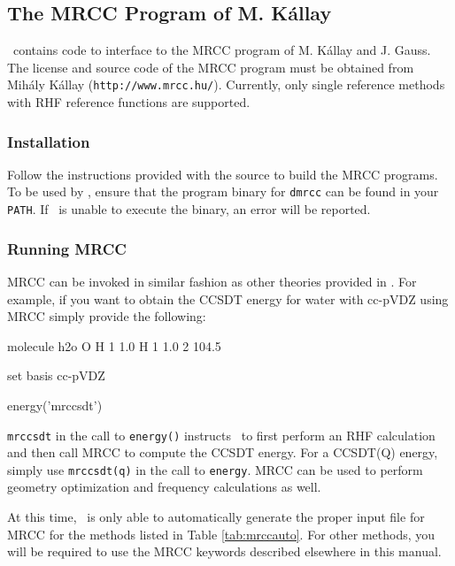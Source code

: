 \subsection{The MRCC Program of M. K\'{a}llay} \label{mrcc}
\PSIfour\ contains code to interface to the MRCC program of M. K\'{a}llay
and J. Gauss.  The license and source code of the MRCC program must be
obtained from Mih\'{a}ly K\'{a}llay ({\tt http://www.mrcc.hu/}). Currently, only single reference methods with RHF reference functions are supported.
\renewcommand{\optionname}[2]{\texttt{\nameref{op-#2-#1}}}

\subsubsection{Installation}
Follow the instructions provided with the source to build the MRCC programs. To be used by \PSIfour, ensure that the program binary for {\tt dmrcc} can be found in your {\tt PATH}. If \PSIfour\ is unable to execute the binary, an error will be reported.

\subsubsection{Running MRCC}
MRCC can be invoked in similar fashion as other theories provided in \PSIfour. For example, if you want to obtain the CCSDT energy for water with cc-pVDZ using MRCC simply provide the following:

\begin{Snippet}
molecule h2o {
    O
    H 1 1.0
    H 1 1.0 2 104.5
}

set {
    basis cc-pVDZ
}

energy('mrccsdt')
\end{Snippet}

{\tt mrccsdt} in the call to {\tt energy()} instructs \PSIfour\ to first perform an RHF calculation and then call MRCC to compute the CCSDT energy. For a CCSDT(Q) energy, simply use {\tt mrccsdt(q)} in the call to {\tt energy}.  MRCC can be used to perform geometry optimization and frequency calculations as well.

At this time, \PSIfour\ is only able to automatically generate the proper
input file for MRCC for the methods listed in Table \ref{tab:mrccauto}. For other methods, you will be required to use the MRCC keywords described elsewhere in this manual.

